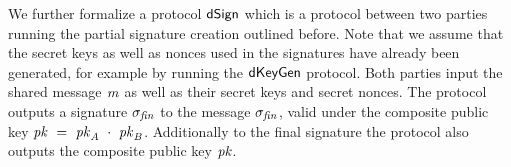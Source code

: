 We further formalize a protocol $\mathsf{dSign}$ which is a protocol between two parties running the partial signature creation outlined before.
Note that we assume that the secret keys as well as nonces used in the signatures have already been generated, for example by running the $\mathsf{dKeyGen}$ protocol.
Both parties input the shared message $\mathit{m}$ as well as their secret keys and secret nonces.
The protocol outputs a signature $\sigma_{\mathit{fin}}$ to the message $\sigma_{\mathit{fin}}$, valid under the composite public key $\mathit{pk} ~=~ \mathit{pk}_{\mathit{A}} ~\cdot~ \mathit{pk}_{\mathit{B}}$.
Additionally to the final signature the protocol also outputs the composite public key $\mathit{pk}$.

\begin{center}
\end{center}

